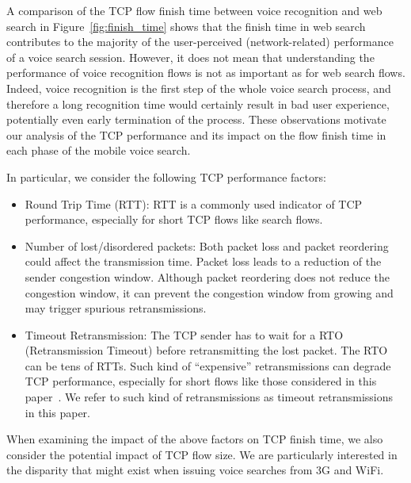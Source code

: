 A comparison of the TCP flow finish time between voice recognition and web search in Figure~\ref{fig:finish_time} shows that the finish time in web search contributes to the majority of the user-perceived (network-related) performance of a voice search session. However, it does not mean that understanding the performance of voice recognition flows is not as important as for web search flows. Indeed, voice recognition is the first step of the whole voice search process, and therefore a long recognition time would certainly result in bad user experience, potentially even early termination of the process. These observations motivate our analysis of the TCP performance and its impact on the flow finish time in each phase of the mobile voice search.



In particular, we consider the following TCP performance factors:

\begin{itemize}
	\item {Round Trip Time (RTT):} RTT is a commonly used indicator of TCP performance, especially for short TCP flows like search flows.
	
	\item {Number of lost/disordered packets:} Both packet loss and packet reordering could affect the transmission time. Packet loss leads to a reduction of the sender congestion window. Although packet reordering does not reduce the congestion window, it can prevent the congestion window from growing and may trigger spurious retransmissions. 
	
	\item {Timeout Retransmission:} The TCP sender has to wait for a RTO (Retransmission Timeout) before retransmitting the lost packet. The RTO can be tens of RTTs. Such kind of ``expensive'' retransmissions can degrade TCP performance, especially for short flows like those considered in this paper~\cite{flach2013reducing}. We refer to such kind of retransmissions as timeout retransmissions in this paper.

	
\end{itemize}

When examining the impact of the above factors on TCP finish time, we also consider the potential impact of TCP flow size. We are particularly interested in the disparity that might exist when issuing voice searches from 3G and WiFi. 